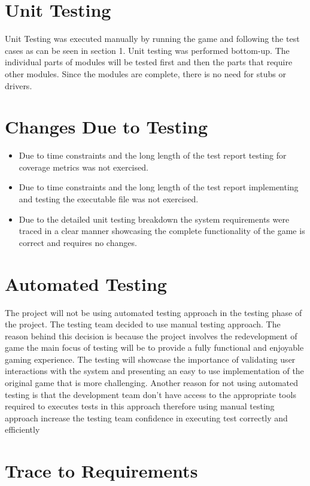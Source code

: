 \documentclass[12pt, titlepage]{article}
\begin{document}
\section{Unit Testing}
Unit Testing was executed manually by running the game and following the test cases as can be seen in section 1. Unit testing was performed bottom-up. The individual parts of modules will be tested first and then the parts that require other  modules. Since the modules are complete, there is no need for  stubs or drivers.  

\section{Changes Due to Testing}
\begin{itemize}
    \item Due to time constraints and the long length of the test report testing for coverage metrics was not exercised. 
    \item Due to time constraints and the long length of the test report implementing and testing the executable file was not exercised.
    \item Due to the detailed unit testing breakdown the system requirements were traced in a clear manner showcasing the complete functionality of the game is correct and requires no changes. 
\end{itemize}

\section{Automated Testing}

The project will not be using automated testing approach in the testing phase of the project. The testing team decided to use manual testing approach. The reason behind this decision is because the project involves the redevelopment of game the main focus of testing will be to provide a fully functional and enjoyable gaming experience.  The testing will showcase the importance of validating user interactions with the system and presenting an easy to use implementation of the original game that is more challenging. Another reason for  not  using  automated  testing  is  that  the  development  team  don’t  have access  to  the  appropriate  tools  required  to  executes  tests  in  this  approach therefore using manual testing approach increase the testing team confidence in executing test correctly and efficiently
		
\section{Trace to Requirements}
\end{document}
